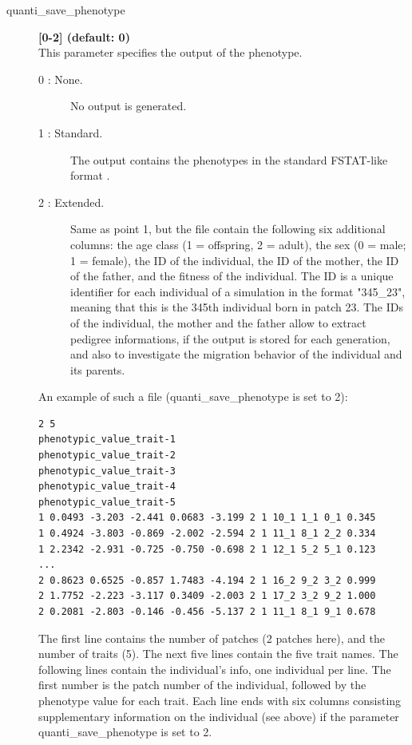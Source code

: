 \documentclass[letterpaper,12pt,oneside]{book}
\begin{document}
\begin{description} 
\item[quanti\_save\_phenotype] \textbf{[0-2] (default: 0)} \\
This parameter specifies the output of the phenotype.
\begin{description}
\item [0 : None.] No output is generated.
\item [1 : Standard.] The output contains the phenotypes in the standard FSTAT-like format \citep{Goudet_1995}. 
\item [2 : Extended.] Same as point 1, but the file contain the following six additional columns: the age class (1 = offspring, 2 = adult), the sex (0 = male; 1 = female), the ID of the individual, the ID of the mother, the ID of the father, and the fitness of the individual. The ID is a unique identifier for each individual of a simulation in the format "345\_23", meaning that this is the 345th individual born in patch 23. The IDs of the individual, the mother and the father allow to extract pedigree informations, if the output is stored for each generation, and also to investigate the migration behavior of the individual and its parents. 
\end{description} 

An example of such a file (\textsf{quanti\_save\_phenotype} is set to 2):
\begin{lstlisting}[frame=single]
2 5
phenotypic_value_trait-1
phenotypic_value_trait-2
phenotypic_value_trait-3
phenotypic_value_trait-4
phenotypic_value_trait-5
1 0.0493 -3.203 -2.441 0.0683 -3.199 2 1 10_1 1_1 0_1 0.345
1 0.4924 -3.803 -0.869 -2.002 -2.594 2 1 11_1 8_1 2_2 0.334
1 2.2342 -2.931 -0.725 -0.750 -0.698 2 1 12_1 5_2 5_1 0.123
...
2 0.8623 0.6525 -0.857 1.7483 -4.194 2 1 16_2 9_2 3_2 0.999
2 1.7752 -2.223 -3.117 0.3409 -2.003 2 1 17_2 3_2 9_2 1.000
2 0.2081 -2.803 -0.146 -0.456 -5.137 2 1 11_1 8_1 9_1 0.678
\end{lstlisting}

The first line contains the number of patches (2 patches here), and the number of traits (5). The next five lines contain the five trait names. The following lines contain the individual's info, one individual per line. The first number is the patch number of the individual, followed by the phenotype value for each trait. Each line ends with six columns consisting supplementary information on the individual (see above) if the parameter \textsf{quanti\_save\_phenotype} is set to 2.


\end{description}
\end{document}
